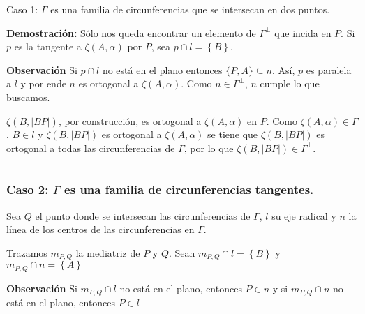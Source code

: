 \documentclass[12pt]{beamer}
\theoremstyle{definition}
\newenvironment{obs}{\begin{alertblock}{\textbf{Observación}}}{\end{alertblock}}
\newenvironment{dem}{\noindent\textbf{Demostración:}}{\begin{flushright}
\rule{1ex}{1ex} \end{flushright}}
\begin{document}
\begin{frame}{Caso 1: $\Gamma$ es una familia de circunferencias que se intersecan en dos puntos.}
\pause

\begin{dem}
Sólo nos queda encontrar un elemento de $\Gamma^\bot$ que incida en $P$. \pause Si $p$ es la tangente a $\zeta(A, \alpha)$ por $P$, sea $p \cap l = \left\{B \right\}$. 
\pause

\begin{obs}
Si $p \cap \textit{l}$  no está en el plano entonces $\{P, A\} \subseteq n$. Así, $p$ es paralela a $l$ y por ende $n$ es ortogonal a $\zeta(A, \alpha)$. Como $n \in \Gamma^\bot$, $n$ cumple lo que buscamos.
\end{obs}
\pause

$\zeta(B, |BP|)$, por construcción, es ortogonal a $\zeta(A, \alpha)$ en $P$. \pause Como $\zeta(A, \alpha) \in \Gamma$, $B \in l$ y $\zeta(B, |BP|)$ es ortogonal a $\zeta(A, \alpha)$ se tiene que $\zeta(B, |BP|)$ es ortogonal a todas las circunferencias de $\Gamma$, por lo que $\zeta(B, |BP|) \in \Gamma^\bot$.
\end{dem}
\end{frame}












\begin{frame}
\frametitle{Caso 2: $\Gamma$ es una familia de circunferencias tangentes.}

Sea $Q$ el punto donde se intersecan las circunferencias de $\Gamma$, $\textit{l}$ su eje radical y $\textit{n}$ la línea de los centros de las circunferencias en $\Gamma$. 

Trazamos $m_{P, Q}$ la mediatriz de $P$ y $Q$. Sean $m_{P, Q} \cap \textit{l} = \left\lbrace B \right\rbrace$ y $m_{P, Q} \cap \textit{n} = \left\lbrace A \right\rbrace$

\vspace{0.2cm}

\begin{obs}
Si $m_{P, Q} \cap \textit{l}$ no está en el plano, entonces $P \in \textit{n}$ y si $m_{P, Q} \cap \textit{n}$ no está en el plano, entonces $P \in \textit{l}$
\end{obs}
\end{frame}
\end{document}
